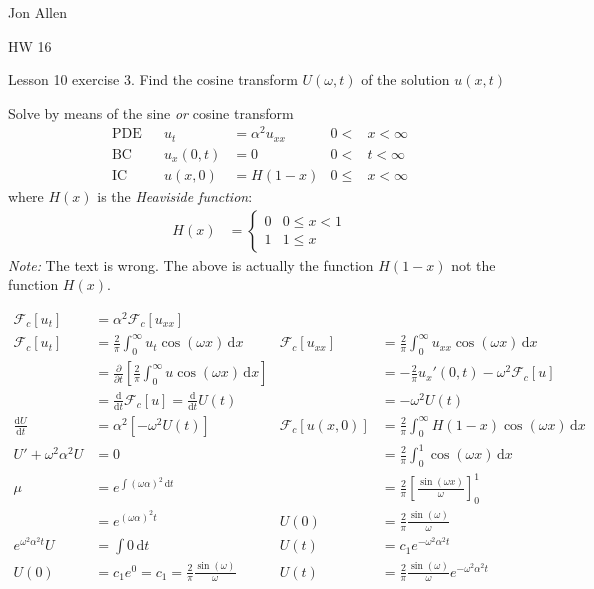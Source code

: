 \documentclass{article}
\begin{document}
Jon Allen

HW 16

Lesson 10 exercise 3. Find the cosine transform $U(\omega ,t)$ of the solution $u(x,t)$

Solve by means of the sine \emph{or} cosine transform
\begin{align*}
  \text{PDE}&&u_t&=\alpha ^2u_{xx}&0<&x<\infty\\
  \text{BC}&&u_x(0,t)&=0&0<&t<\infty\\
  \text{IC}&&u(x,0)&=H(1-x)&0\le&x<\infty
\end{align*}
where $H(x)$ is the \emph{Heaviside function}:
\begin{align*}
  H(x)&=
  \begin{cases}
    0&0\le x<1\\
    1&1\le x
  \end{cases}
\end{align*}
\emph{Note:} The text is wrong. The above is actually the function $H(1-x)$ not the function $H(x)$.

%  

\begin{align*}
  \mathcal{F}_c[u_t]&=\alpha ^2\mathcal{F}_c[u_{xx}]\\
  \mathcal{F}_c[u_t]&=\frac{2}{\pi }\int_0^\infty{u_t\cos(\omega x)\,\mathrm{d}x}&
  \mathcal{F}_c[u_{xx}]&=\frac{2}{\pi }\int_0^\infty{u_{xx}\cos(\omega x)\,\mathrm{d}x}\\
  &=\frac{\partial}{\partial t}\left[\frac{2}{\pi }\int_0^\infty{u\cos(\omega x)\,\mathrm{d}x}\right]&
  &=-\frac{2}{\pi }{u_x}'(0,t)-\omega^2\mathcal{F}_c[u]\\
  &=\frac{\mathrm{d}}{\mathrm{d}t}\mathcal{F}_c[u]=\frac{\mathrm{d}}{\mathrm{d}t}U(t)&
  &=-\omega^2U(t)\\
  \frac{\mathrm{d}U}{\mathrm{d}t}&=\alpha^2\left[-\omega^2U(t)\right]&
  \mathcal{F}_c[u(x,0)]&=\frac{2}{\pi }\int_0^\infty{H(1-x)\cos(\omega x)\,\mathrm{d}x}\\
  U'+\omega^2\alpha^2U&=0
  &&=\frac{2}{\pi }\int_0^1{\cos(\omega x)\,\mathrm{d}x}\\
  \mu &=e^{\int{(\omega \alpha )^2\,\mathrm{d}t}}
  &&=\frac{2}{\pi }\left[\frac{\sin(\omega x)}{\omega }\right]_0^1\\
  &=e^{(\omega \alpha )^2t}
  &U(0)&=\frac{2}{\pi }\frac{\sin(\omega )}{\omega }\\
  e^{\omega^2 \alpha^2t}U&=\int{0\,\mathrm{d}t}&
  U(t)&=c_1e^{-\omega ^2\alpha^2t}\\
  U(0)&=c_1e^0=c_1=\frac{2}{\pi }\frac{\sin(\omega )}{\omega }&
  U(t)&=\frac{2}{\pi }\frac{\sin(\omega )}{\omega }e^{-\omega ^2\alpha^2t}\\
\end{align*}
\end{document}
